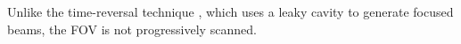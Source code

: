 Unlike
the time-reversal technique
\cite{article:MontaldoITUFFC2005}, which uses
a leaky cavity to generate
focused beams,
the \ac{FOV} is not progressively scanned.

